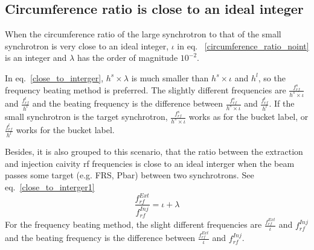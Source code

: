 \subsection{Circumference ratio is close to an ideal integer}
When the circumference ratio of the large synchrotron to that of the small synchrotron is very close to an ideal integer, $\iota$ in eq. ~\ref{circumference_ratio_noint} is an integer and $\lambda$ has the order of magnitude $10^{-2}$.


In eq.~\ref{close_to_interger}, $h^s\times\lambda $ is much smaller than $h^s \times \iota$ and $h^l$, so the frequency beating method is preferred. The slightly different frequencies are $\frac{f_{rf}^{s}}{h^s \times \iota}$ and $\frac{f_{rf}^{l}}{h^l}$ and the beating frequency is the difference between $\frac{f_{rf}^{s}}{h^s \times \iota}$ and $\frac{f_{rf}^{l}}{h^l}$. If the small synchrotron is the target synchrotron, $\frac{f_{rf}^{s}}{h^s \times \iota}$ works as for the bucket label, or $\frac{f_{rf}^{l}}{h^l}$ works for the bucket label. 

Besides, it is also grouped to this scenario, that the ratio between the extraction and injection caivity rf frequencies is close to an ideal interger when the beam passes some target (e.g. FRS, Pbar) between two synchrotrons. See eq.~\ref{close_to_interger1} 
\begin{equation} 
\frac{f_{rf}^{Ext}}{f_{rf}^{Inj}}=\iota+ \lambda\label{close_to_interger1}
\end{equation}
For the frequency beating method, the slight different frequencies are $\frac{f_{rf}^{Ext}}{\iota}$ and $f_{rf}^{Inj}$ and the beating frequency is the difference between $\frac{f_{rf}^{Ext}}{\iota}$ and $f_{rf}^{Inj}$. 

